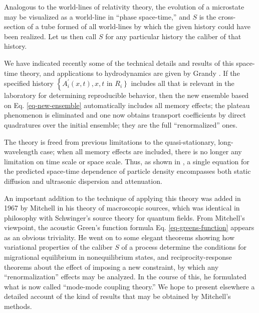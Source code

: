 \documentclass{article}
\begin{document}
Analogous to the world-lines of relativity theory, the evolution of a microstate may be visualized as a world-line in ``phase space-time,'' and $S$ is the cross-section of a tube formed of all world-lines by which the given history could have been realized. Let us then call $S$ for any particular history the caliber of that history.

We have indicated recently \cite{jaynes1978} some of the technical details and results of this space-time theory, and applications to hydrodynamics are given by Grandy \cite{grandy1980}. If the specified history $\left\{A_i^{\prime}(x, t), x, t\right.$ in $\left.R_i\right\}$ includes all that is relevant in the laboratory for determining reproducible behavior, then the new ensemble based on Eq. \ref{eq-new-ensemble} automatically includes all memory effects; the plateau phenomenon is eliminated and one now obtains transport coefficients by direct quadratures over the initial ensemble; they are the full ``renormalized'' ones.

The theory is freed from previous limitations to the quasi-stationary, long-wavelength case; when all memory effects are included, there is no longer any limitation on time scale or space scale. Thus, as shown in \cite{jaynes1978}, a single equation for the predicted space-time dependence of particle density encompasses both static diffusion and ultrasonic dispersion and attenuation.

An important addition to the technique of applying this theory was added in 1967 by Mitchell \cite{mitchell1967} in his theory of macroscopic sources, which was identical in philosophy with Schwinger's source theory for quantum fields. From Mitchell's viewpoint, the acoustic Green's function formula Eq. \ref{eq-greens-function} appears as an obvious triviality. He went on to some elegant theorems showing how variational properties of the caliber $S$ of a process determine the conditions for migrational equilibrium in nonequilibrium states, and reciprocity-response theorems about the effect of imposing a new constraint, by which any ``renormalization'' effects may be analyzed. In the course of this, he formulated what is now called ``mode-mode coupling theory.'' We hope to present elsewhere a detailed account of the kind of results that may be obtained by Mitchell's methods.
\end{document}
